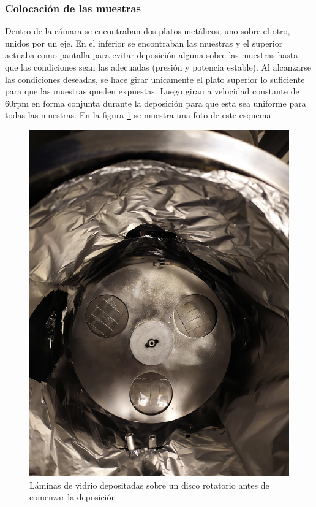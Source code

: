 \documentclass{article}
\theoremstyle{definition}
\theoremstyle{remark}
\begin{document}
\subsubsection{Colocación de las muestras}
Dentro de la cámara se encontraban dos platos metálicos, uno sobre el otro, unidos por un eje. En el inferior se encontraban las muestras y el superior actuaba como pantalla para evitar deposición alguna sobre las muestras hasta que las condiciones sean las adecuadas (presión y potencia estable). Al alcanzarse las condiciones deseadas, se hace girar unicamente el plato superior lo suficiente para que las muestras queden expuestas. Luego giran a velocidad constante de 60rpm en forma conjunta durante la deposición para que esta sea uniforme para todas las muestras. En la figura \ref{muestras} se muestra una foto de este esquema

\begin{figure}[H]
	\centering
	\includegraphics[scale=0.1]{img/muestras.jpg}
	\caption{Láminas de vidrio depositadas sobre un disco rotatorio antes de comenzar la deposición}
	\label{muestras}
\end{figure}
\end{document}
